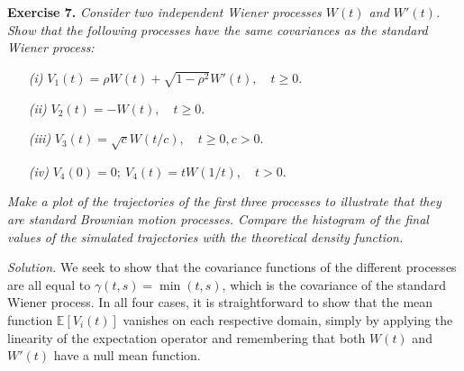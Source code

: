 
\textbf{Exercise 7. }\emph{Consider two independent Wiener processes \( W(t) \) and \( W'(t) \). Show that the following processes have the same covariances as the standard Wiener process:}

\begin{enumerate}
  \item[\textit{(i)}] \( V_1(t)=\rho W(t) + \sqrt{1 - \rho^{2}}W'(t),\quad t \geq 0 \).
  \item[\textit{(ii)}] \( V_2(t)=-W(t), \quad t\geq 0 \).
  \item[\textit{(iii)}] \( V_3(t)=\sqrt{c}W(t/c),\quad t \geq 0, c > 0 \).
  \item[\textit{(iv)}] \( V_4(0) = 0;\ V_4(t) = tW(1/t), \quad t> 0 \).
\end{enumerate}
\emph{Make a plot of the trajectories of the first three processes to illustrate that they are standard Brownian motion processes. Compare the histogram of the final values of the simulated trajectories with the theoretical density function.}

\emph{Solution.} We seek to show that the covariance functions of the different processes are all equal to \( \gamma(t, s)=\min(t,s) \), which is the covariance of the standard Wiener process. In all four cases, it is straightforward to show that the mean function $\mathbb E[V_i(t)]$ vanishes on each respective domain, simply by applying the linearity of the expectation operator and remembering that both $W(t)$ and $W'(t)$ have a null mean function.

